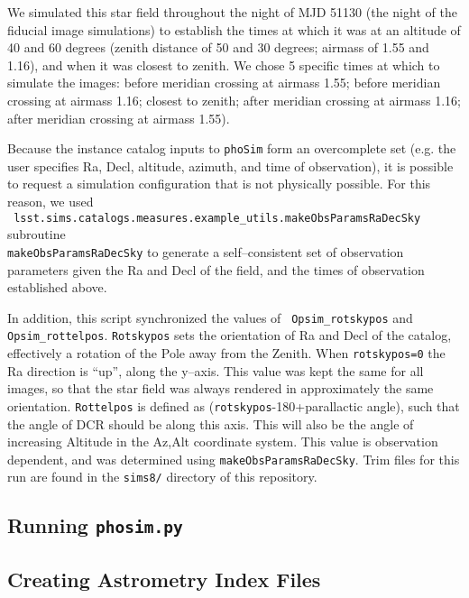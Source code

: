\documentclass[prd, nofootinbib, floatfix, 11pt, tightenlines, times]{article}
\begin{document}
\begin{appendices}
We simulated this star field throughout the night of MJD 51130 (the
night of the fiducial image simulations) to establish the times at
which it was at an altitude of 40 and 60 degrees (zenith distance of
50 and 30 degrees; airmass of 1.55 and 1.16), and when it was closest
to zenith.  We chose 5 specific times at which to simulate the images:
before meridian crossing at airmass 1.55; before meridian crossing at
airmass 1.16; closest to zenith; after meridian crossing at airmass
1.16; after meridian crossing at airmass 1.55).

Because the instance catalog inputs to {\tt phoSim} form an
overcomplete set (e.g. the user specifies Ra, Decl, altitude, azimuth,
and time of observation), it is possible to request a simulation
configuration that is not physically possible.  For this reason, we
used \\{\tt
  lsst.sims.catalogs.measures.example\_utils.makeObsParamsRaDecSky}
subroutine \\{\tt makeObsParamsRaDecSky} to generate a self--consistent
set of observation parameters given the Ra and Decl of the field, and
the times of observation established above.

In addition, this script synchronized the values of {\tt
  Opsim\_rotskypos} and {\tt Opsim\_rottelpos}.  {\tt Rotskypos} sets
the orientation of Ra and Decl of the catalog, effectively a rotation
of the Pole away from the Zenith.  When {\tt rotskypos=0} the Ra
direction is ``up'', along the y--axis.  This value was kept the same
for all images, so that the star field was always rendered in
approximately the same orientation.  {\tt Rottelpos} is defined as
({\tt rotskypos}-180+parallactic angle), such that the angle of DCR
should be along this axis.  This will also be the angle of increasing
Altitude in the Az,Alt coordinate system.  This value is observation
dependent, and was determined using {\tt makeObsParamsRaDecSky}.  Trim
files for this run are found in the {\tt sims8/} directory of this
repository.

\subsection{Running {\tt phosim.py}}

\subsection{Creating Astrometry Index Files}


\end{appendices}
\end{document}
